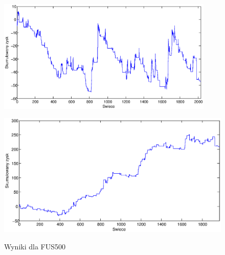 \begin{figure}[h]
\begin{minipage}{.49\linewidth}
\label{cztero}
\end{minipage}
\begin{minipage}{.49\linewidth}
\centering
\includegraphics[width=0.92\textwidth]{images/S1d_fus500.eps}
\label{mansard}
\end{minipage}
\begin{minipage}{\linewidth}
\centering
\includegraphics[width=\textwidth]{images/S1s_fus500.eps}
\label{mansard}
\end{minipage}
\caption{Wyniki dla FUS500}
\end{figure}
\FloatBarrier
